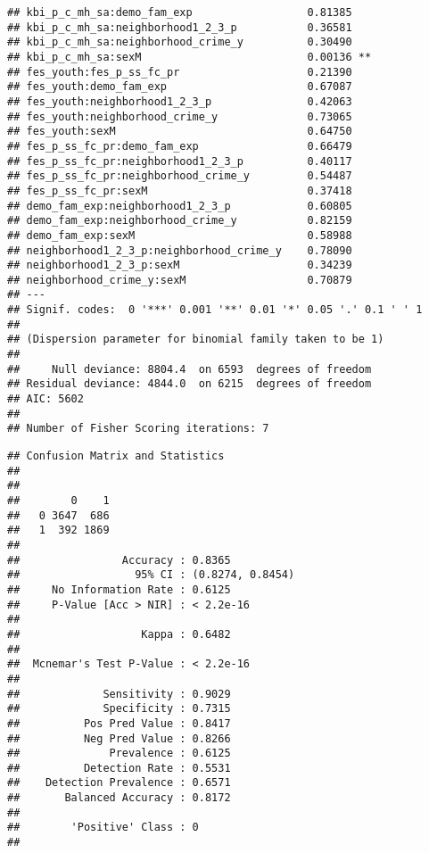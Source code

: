 \documentclass[
]{article}
\newenvironment{Shaded}{\begin{snugshade}}{\end{snugshade}}
\newcommand{\FloatTok}[1]{\textcolor[rgb]{0.00,0.00,0.81}{#1}}
\newcommand{\FunctionTok}[1]{\textcolor[rgb]{0.00,0.00,0.00}{#1}}
\newcommand{\NormalTok}[1]{#1}
\newcommand{\OtherTok}[1]{\textcolor[rgb]{0.56,0.35,0.01}{#1}}
\newcommand{\SpecialCharTok}[1]{\textcolor[rgb]{0.00,0.00,0.00}{#1}}
\begin{document}
\begin{verbatim}
## kbi_p_c_mh_sa:demo_fam_exp                  0.81385    
## kbi_p_c_mh_sa:neighborhood1_2_3_p           0.36581    
## kbi_p_c_mh_sa:neighborhood_crime_y          0.30490    
## kbi_p_c_mh_sa:sexM                          0.00136 ** 
## fes_youth:fes_p_ss_fc_pr                    0.21390    
## fes_youth:demo_fam_exp                      0.67087    
## fes_youth:neighborhood1_2_3_p               0.42063    
## fes_youth:neighborhood_crime_y              0.73065    
## fes_youth:sexM                              0.64750    
## fes_p_ss_fc_pr:demo_fam_exp                 0.66479    
## fes_p_ss_fc_pr:neighborhood1_2_3_p          0.40117    
## fes_p_ss_fc_pr:neighborhood_crime_y         0.54487    
## fes_p_ss_fc_pr:sexM                         0.37418    
## demo_fam_exp:neighborhood1_2_3_p            0.60805    
## demo_fam_exp:neighborhood_crime_y           0.82159    
## demo_fam_exp:sexM                           0.58988    
## neighborhood1_2_3_p:neighborhood_crime_y    0.78090    
## neighborhood1_2_3_p:sexM                    0.34239    
## neighborhood_crime_y:sexM                   0.70879    
## ---
## Signif. codes:  0 '***' 0.001 '**' 0.01 '*' 0.05 '.' 0.1 ' ' 1
## 
## (Dispersion parameter for binomial family taken to be 1)
## 
##     Null deviance: 8804.4  on 6593  degrees of freedom
## Residual deviance: 4844.0  on 6215  degrees of freedom
## AIC: 5602
## 
## Number of Fisher Scoring iterations: 7
\end{verbatim}

\begin{Shaded}
\end{Shaded}

\begin{verbatim}
## Confusion Matrix and Statistics
## 
##    
##        0    1
##   0 3647  686
##   1  392 1869
##                                           
##                Accuracy : 0.8365          
##                  95% CI : (0.8274, 0.8454)
##     No Information Rate : 0.6125          
##     P-Value [Acc > NIR] : < 2.2e-16       
##                                           
##                   Kappa : 0.6482          
##                                           
##  Mcnemar's Test P-Value : < 2.2e-16       
##                                           
##             Sensitivity : 0.9029          
##             Specificity : 0.7315          
##          Pos Pred Value : 0.8417          
##          Neg Pred Value : 0.8266          
##              Prevalence : 0.6125          
##          Detection Rate : 0.5531          
##    Detection Prevalence : 0.6571          
##       Balanced Accuracy : 0.8172          
##                                           
##        'Positive' Class : 0               
## 
\end{verbatim}
\end{document}
